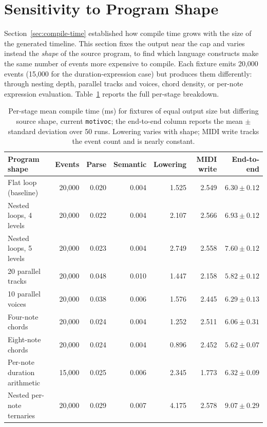 \section{Sensitivity to Program Shape}\label{sec:scaling-stress}

Section~\ref{sec:compile-time} established how compile time grows with the size of the generated timeline.
This section fixes the output near the cap and varies instead the \emph{shape} of the source program, to find which
language constructs make the same number of events more expensive to compile.
Each fixture emits 20{,}000 events (15{,}000 for the duration-expression case) but produces them differently: through
nesting depth, parallel tracks and voices, chord density, or per-note expression evaluation.
Table~\ref{tab:stress-suite} reports the full per-stage breakdown.

\begin{table}[htbp]
  \centering
  \footnotesize
  \setlength{\tabcolsep}{4.5pt}
  \renewcommand{\arraystretch}{1.25}
  \begin{tabular}{lrrrrrr}
    \toprule
    \textbf{Program shape} & \textbf{Events} & \textbf{Parse} & \textbf{Semantic} & \textbf{Lowering} &
    \textbf{MIDI write} & \textbf{End-to-end} \\
    \midrule
    Flat loop (baseline)         & 20,000 & 0.020 & 0.004 & 1.525 & 2.549 & $6.30 \pm 0.12$ \\
    Nested loops, 4 levels       & 20,000 & 0.022 & 0.004 & 2.107 & 2.566 & $6.93 \pm 0.12$ \\
    Nested loops, 5 levels       & 20,000 & 0.023 & 0.004 & 2.749 & 2.558 & $7.60 \pm 0.12$ \\
    20 parallel tracks           & 20,000 & 0.048 & 0.010 & 1.447 & 2.158 & $5.82 \pm 0.12$ \\
    10 parallel voices           & 20,000 & 0.038 & 0.006 & 1.576 & 2.445 & $6.29 \pm 0.13$ \\
    Four-note chords             & 20,000 & 0.024 & 0.004 & 1.252 & 2.511 & $6.06 \pm 0.31$ \\
    Eight-note chords            & 20,000 & 0.024 & 0.004 & 0.896 & 2.452 & $5.62 \pm 0.07$ \\
    Per-note duration arithmetic & 15,000 & 0.025 & 0.006 & 2.345 & 1.773 & $6.32 \pm 0.09$ \\
    Nested per-note ternaries    & 20,000 & 0.029 & 0.007 & 4.175 & 2.578 & $9.07 \pm 0.29$ \\
    \bottomrule
  \end{tabular}
  \caption{Per-stage mean compile time (ms) for fixtures of equal output size but differing source shape, current
    \texttt{motivoc}; the end-to-end column reports the mean $\pm$ standard deviation over 50 runs. Lowering varies with
  shape; MIDI write tracks the event count and is nearly constant.}\label{tab:stress-suite}
\end{table}

